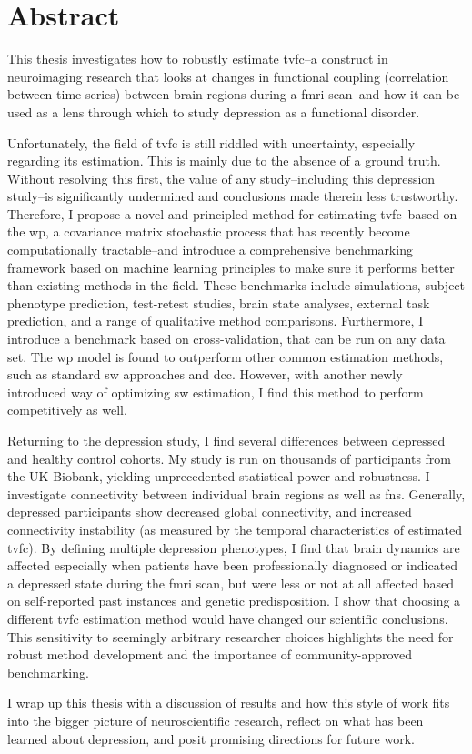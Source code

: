\chapter*{Abstract}

This thesis investigates how to robustly estimate \gls{tvfc}--a construct in neuroimaging research that looks at changes in functional coupling (correlation between time series) between brain regions during a \gls{fmri} scan--and how it can be used as a lens through which to study depression as a functional disorder.

Unfortunately, the field of \gls{tvfc} is still riddled with uncertainty, especially regarding its estimation.
This is mainly due to the absence of a ground truth.
Without resolving this first, the value of any study--including this depression study--is significantly undermined and conclusions made therein less trustworthy.
Therefore, I propose a novel and principled method for estimating \gls{tvfc}--based on the \gls{wp}, a covariance matrix stochastic process that has recently become computationally tractable--and introduce a comprehensive benchmarking framework based on machine learning principles to make sure it performs better than existing methods in the field.
These benchmarks include simulations, subject phenotype prediction, test-retest studies, brain state analyses, external task prediction, and a range of qualitative method comparisons.
Furthermore, I introduce a benchmark based on cross-validation, that can be run on any data set.
The \gls{wp} model is found to outperform other common estimation methods, such as standard \gls{sw} approaches and \gls{dcc}.
However, with another newly introduced way of optimizing \gls{sw} estimation, I find this method to perform competitively as well.

Returning to the depression study, I find several differences between depressed and healthy control cohorts.
My study is run on thousands of participants from the UK Biobank, yielding unprecedented statistical power and robustness.
I investigate connectivity between individual brain regions as well as \glspl{fn}.
Generally, depressed participants show decreased global connectivity, and increased connectivity instability (as measured by the temporal characteristics of estimated \gls{tvfc}).
By defining multiple depression phenotypes, I find that brain dynamics are affected especially when patients have been professionally diagnosed or indicated a depressed state during the \gls{fmri} scan, but were less or not at all affected based on self-reported past instances and genetic predisposition.
I show that choosing a different \gls{tvfc} estimation method would have changed our scientific conclusions.
This sensitivity to seemingly arbitrary researcher choices highlights the need for robust method development and the importance of community-approved benchmarking.

I wrap up this thesis with a discussion of results and how this style of work fits into the bigger picture of neuroscientific research, reflect on what has been learned about depression, and posit promising directions for future work.
